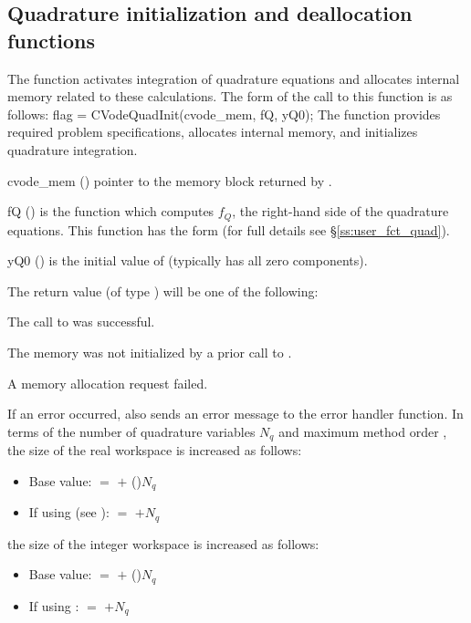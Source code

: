 
\subsection{Quadrature initialization and deallocation functions}\label{ss:quad_malloc}

The function  activates integration of quadrature equations
and allocates internal memory related to these calculations.
The form of the call to this function is as follows:
{
flag = CVodeQuadInit(cvode\_mem, fQ, yQ0);
}
{
  The function  provides required problem specifications,
  allocates internal memory, and initializes quadrature integration.
}
{
  \begin{args}
  \item[cvode\_mem] ()
    pointer to the {\cvodes} memory block returned by .
  \item[fQ] ()
    is the {\CC} function which computes $f_Q$, the right-hand side of the quadrature
    equations. This function has the form
     (for full details see \S\ref{ss:user_fct_quad}).
  \item[yQ0] ()
    is the initial value of  (typically  has all zero components).
  \end{args}
}
{
  The return value  (of type ) will be one of the following:
  \begin{args}
  \item[\Id{CV\_SUCCESS}]
    The call to  was successful.
  \item[\Id{CV\_MEM\_NULL}]
    The {\cvodes} memory was not initialized by a prior call to .
  \item[\Id{CV\_MEM\_FAIL}]
    A memory allocation request failed.
  \end{args}
}
{
  If an error occurred,  also sends an error message to the
  error handler function.
}
In terms of the number of quadrature variables $N_q$ and maximum method order ,
the size of the real workspace is increased as follows:
\begin{itemize}
\item Base value:  $=$  $+$ ()$N_q$
\item If using  (see ):  $=$  $+ N_q$
\end{itemize}
the size of the integer workspace is increased as follows:
\begin{itemize}
\item Base value:  $=$  $+$ ()$N_q$
\item If using :  $=$  $+ N_q$
\end{itemize}

